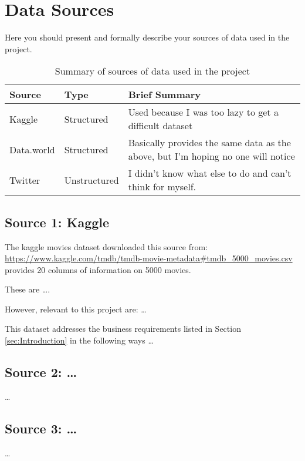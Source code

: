 \section{Data Sources}
\label{sec:dataSources}
Here you should present and formally describe your sources of data used in the project.

\begin{table}
\centering
\begin{tabular}[h]{||p{.2\linewidth}||p{.2\linewidth}|p{.5\linewidth}||}
\hline\hline
Source & Type & Brief Summary \\\hline\hline

Kaggle & Structured & Used because I was too lazy to get a difficult dataset \\\hline
Data.world & Structured & Basically provides the same data as the above, but I'm hoping no one will notice \\\hline
Twitter & Unstructured & I didn't know what else to do and can't think for myself. \\\hline\hline
\end{tabular}

\caption{Summary of sources of data used in the project}

\end{table}

\subsection{Source 1: Kaggle}
The kaggle movies dataset downloaded this source from: \url{https://www.kaggle.com/tmdb/tmdb-movie-metadata#tmdb_5000_movies.csv}  provides 20 columns of information on 5000 movies. 

These are \ldots . 

However, relevant to this project are: \ldots

This dataset addresses the business requirements listed in Section \ref{sec:Introduction} in the following ways \ldots

\subsection{Source 2: \ldots}
\ldots

\subsection{Source 3: \ldots}
\ldots


